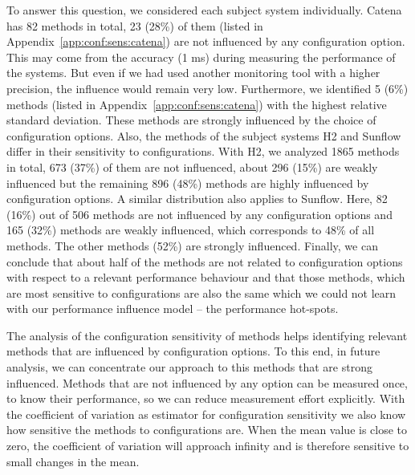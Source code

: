 





To answer this question, we considered each subject system individually. Catena has 82 methods in total, 23 (28\%) of them (listed in Appendix~\ref{app:conf:sens:catena}) are not influenced by any configuration option. This may come from the accuracy (1 ms) during measuring the performance of the systems. But even if we had used another monitoring tool with a higher precision, the influence would remain very low. Furthermore, we identified 5 (6\%) methods (listed in Appendix~\ref{app:conf:sens:catena}) with the highest relative standard deviation. These methods are strongly influenced by the choice of configuration options. Also, the methods of the subject systems H2 and Sunflow differ in their sensitivity to configurations. With H2, we analyzed 1865 methods in total, 673 (37\%) of them are not influenced, about 296 (15\%) are weakly influenced but the remaining 896 (48\%) methods are highly influenced by configuration options. A similar distribution also applies to Sunflow. Here, 82 (16\%) out of 506 methods are not influenced by any configuration options and 165 (32\%) methods are weakly influenced, which corresponds to 48\% of all methods. The other methods (52\%) are strongly influenced. Finally, we can conclude that about half of the methods are not related to configuration options with respect to a relevant performance behaviour and that those methods, which are most sensitive to configurations are also the same which we could not learn with our performance influence model -- the performance hot-spots. 


The analysis of the configuration sensitivity of methods helps identifying relevant methods that are influenced by configuration options. To this end, in future analysis, we can concentrate our approach to this methods that are strong influenced. Methods that are not influenced by any option can be measured once, to know their performance, so we can reduce measurement effort explicitly. With the coefficient of variation as estimator for configuration sensitivity we also know how sensitive the methods to configurations are. When the mean value is close to zero, the coefficient of variation will approach infinity and is therefore sensitive to small changes in the mean.

